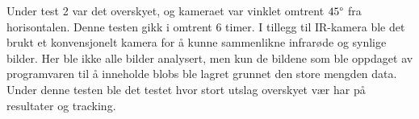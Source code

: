 Under test 2 var det overskyet, og kameraet var vinklet omtrent $45\degree$ fra horisontalen. Denne testen gikk i omtrent 6 timer. I tillegg til IR-kamera ble det brukt et konvensjonelt kamera for å kunne sammenlikne infrarøde og synlige bilder. Her ble ikke alle bilder analysert, men kun de bildene som ble oppdaget av programvaren til å inneholde blobs ble lagret grunnet den store mengden data. Under denne testen ble det testet hvor stort utslag overskyet vær har på resultater og tracking.



